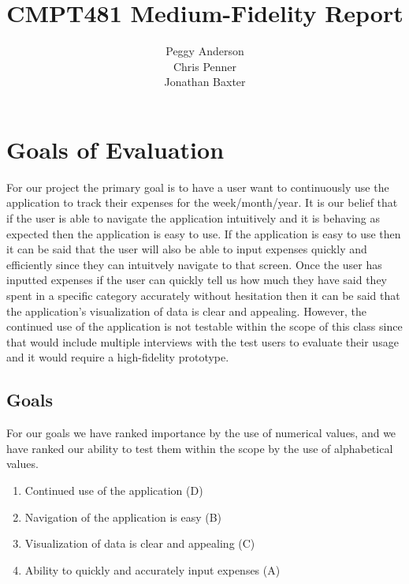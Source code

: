 \documentclass{chi2011}
\begin{document}
\setlength{\paperheight}{11in}
\setlength{\paperwidth}{8.5in}
\setlength{\pdfpageheight}{\paperheight}
\setlength{\pdfpagewidth}{\paperwidth}


\title{CMPT481 Medium-Fidelity Report}
\author{
\alignauthor Peggy Anderson\\
    \alignauthor Chris Penner\\
    \alignauthor Jonathan Baxter\\
}

\maketitle

\section{Goals of Evaluation}

For our project the primary goal is to have a user want to continuously use the application
to track their expenses for the week/month/year. It is our belief that if the user is able 
to navigate the application intuitively and it is behaving as expected then the application 
is easy to use. If the application is easy to use then it can be said that the user will 
also be able to input expenses quickly and efficiently since they can intuitvely navigate 
to that screen. Once the user has inputted expenses if the user can quickly tell us how much
they have said they spent in a specific category accurately without hesitation then it can be
said that the application's visualization of data is clear and appealing. However, the 
continued use of the application is not testable within the scope of this class since that
would include multiple interviews with the test users to evaluate their usage and it would 
require a high-fidelity prototype. 
	\subsection{Goals}
	For our goals we have ranked importance by the use of numerical values, and we
	have ranked our ability to test them within the scope by the use of alphabetical
	values. 
	\begin{enumerate}
	\item Continued use of the application (D)
	\item Navigation of the application is easy (B)
	\item Visualization of data is clear and appealing (C)
	\item Ability to quickly and accurately input expenses (A)
	\end{enumerate}
\end{document}
